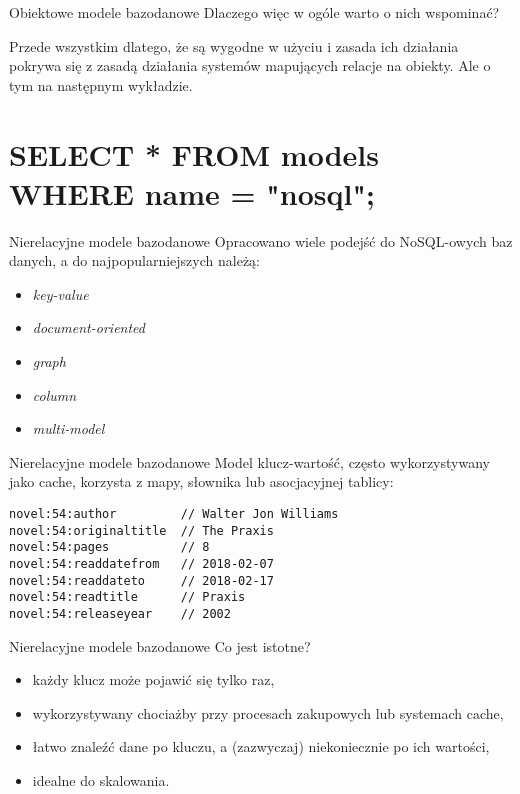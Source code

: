 \begin{frame}[fragile]{Obiektowe modele bazodanowe}
	Dlaczego więc w ogóle warto o nich wspominać?
	
	Przede wszystkim dlatego, że są wygodne w użyciu i zasada ich działania pokrywa się z zasadą działania systemów mapujących relacje na obiekty. Ale o tym na następnym wykładzie.
\end{frame}

\section{SELECT * FROM models WHERE name = "nosql";}

\begin{frame}[fragile]{Nierelacyjne modele bazodanowe}
	Opracowano wiele podejść do NoSQL-owych baz danych, a do najpopularniejszych należą:
	\begin{itemize}
		\item \emph{key-value}
		\item \emph{document-oriented}
		\item \emph{graph}
		\item \emph{column}
		\item \emph{multi-model}
	\end{itemize}
\end{frame}

\begin{frame}[fragile]{Nierelacyjne modele bazodanowe}
	Model klucz-wartość, często wykorzystywany jako cache, korzysta z mapy, słownika lub asocjacyjnej tablicy:

	\begin{lstlisting}
novel:54:author         // Walter Jon Williams
novel:54:originaltitle  // The Praxis
novel:54:pages          // 8
novel:54:readdatefrom   // 2018-02-07
novel:54:readdateto     // 2018-02-17
novel:54:readtitle      // Praxis
novel:54:releaseyear    // 2002
	\end{lstlisting}
\end{frame}

\begin{frame}[fragile]{Nierelacyjne modele bazodanowe}
	Co jest istotne?
	\begin{itemize}
		\item każdy klucz może pojawić się tylko raz,
		\item wykorzystywany chociażby przy procesach zakupowych lub systemach cache,
		\item łatwo znaleźć dane po kluczu, a (zazwyczaj) niekoniecznie po ich wartości,
		\item idealne do skalowania.
	\end{itemize}
\end{frame}

